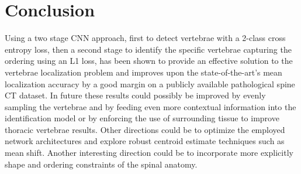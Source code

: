 \chapter{Conclusion}
\label{ch:conclusion}

Using a two stage CNN approach, first to detect vertebrae with a 2-class cross entropy loss, then a second stage to identify the specific vertebrae capturing the ordering using an L1 loss, has been shown to provide an effective solution to the vertebrae localization problem and improves upon the state-of-the-art’s mean localization accuracy by a good margin on a publicly available pathological spine CT dataset. In future these results could possibly be improved by evenly sampling the vertebrae and by feeding even more contextual information into the identification model or by enforcing the use of surrounding tissue to improve thoracic vertebrae results. Other directions could be to optimize the employed network architectures and explore robust centroid estimate techniques such as mean shift. Another interesting direction could be to incorporate more explicitly shape and ordering constraints of the spinal anatomy.